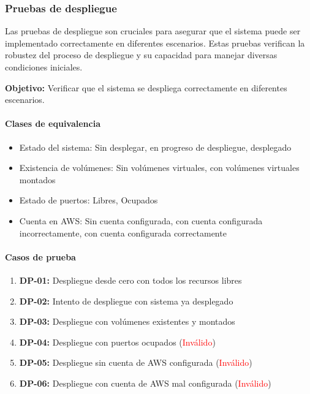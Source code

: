 \newpage{}
\subsubsection{Pruebas de despliegue}
Las pruebas de despliegue son cruciales para asegurar que el sistema puede ser
implementado correctamente en diferentes escenarios. Estas pruebas verifican
la robustez del proceso de despliegue y su capacidad para manejar diversas
condiciones iniciales.

\textbf{Objetivo:} Verificar que el sistema se despliega correctamente en
diferentes escenarios.

\paragraph{Clases de equivalencia}
\begin{itemize}
    \item Estado del sistema: Sin desplegar, en progreso de despliegue,
		desplegado
    \item Existencia de volúmenes: Sin volúmenes virtuales, con volúmenes
		virtuales montados
    \item Estado de puertos: Libres, Ocupados
    \item Cuenta en AWS: Sin cuenta configurada, con cuenta configurada
    incorrectamente, con cuenta configurada correctamente
\end{itemize}

\paragraph{Casos de prueba}
\begin{enumerate}
    \item \textbf{DP-01:} Despliegue desde cero con todos los recursos libres
    \item \textbf{DP-02:} Intento de despliegue con sistema ya desplegado
    \item \textbf{DP-03:} Despliegue con volúmenes existentes y montados
    \item \textbf{DP-04:} Despliegue con puertos ocupados (\textcolor{red}{Inválido})
    \item \textbf{DP-05:} Despliegue sin cuenta de AWS configurada (\textcolor{red}{Inválido})
    \item \textbf{DP-06:} Despliegue con cuenta de AWS mal configurada (\textcolor{red}{Inválido})
\end{enumerate}


\newpage{}
